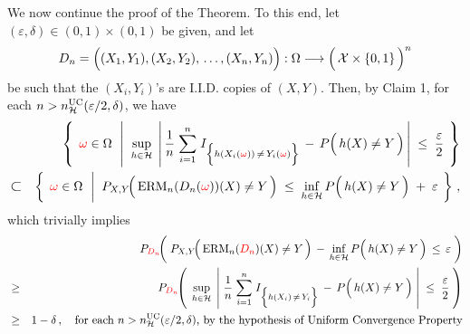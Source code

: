 \vskip 0.5cm
\noindent
We now continue the proof of the Theorem.
To this end, let $(\varepsilon,\delta) \in (0,1) \times (0,1)$ be given, and let
\begin{equation*}
D_{n} = \left((X_{1},Y_{1}),(X_{2},Y_{2}),\,\overset{{\color{white}\vert}}{\ldots}\,,(X_{n},Y_{n})\right)
	: \Omega \longrightarrow
	\left(\,\mathcal{X}\overset{{\color{white}.}}{\times}\{0,1\}\,\right)^{n}
\end{equation*}
be such that the
$(X_{i},Y_{i})$'s are I.I.D. copies of $(X,Y)$.
Then, by Claim 1,
for each $n > n^{\textnormal{UC}}_{\mathcal{H}}(\varepsilon/2,\delta)$, we have
\begin{eqnarray*}
&&
	\left\{\;\,
		{\color{red}\omega} \in \Omega
		\;\,\left\vert\;\;
		\underset{h \in \mathcal{H}}{\sup}\;\left\vert\,
			\dfrac{1}{n}\;\overset{n}{\underset{i=1}{\sum}}\;
				I_{\left\{h(X_{i}({\color{red}\omega}))\,\overset{{\color{white}.}}{\neq}\,Y_{i}({\color{red}\omega})\right\}}
				\,-\,
				P\!\left(\,\overset{{\color{white}.}}{h}(X) \neq Y \,\right)
			\,\right\vert
		\;\leq\;
			\dfrac{\varepsilon}{2}
		\right.\;\right\}
\\
& \textnormal{\large$\subset$} &
	\left\{\;\,
		{\color{red}\omega} \in \Omega
		\;\,\left\vert\;\;
		P_{X,Y}\!\!\left(\,\overset{{\color{white}.}}{\textnormal{ERM}}_{n}(D_{n}({\color{red}\omega}))(X) \neq Y \,\right)
		\; \leq \;
			\underset{h\in\mathcal{H}}{\inf}\,P\!\left(\,\overset{{\color{white}.}}{h}(X) \neq Y \,\right)
			\; + \; \varepsilon
		\right.\;\right\}\,,
\end{eqnarray*}
which trivially implies
\begin{eqnarray*}
&&
P_{{\color{red}D_{n}}}\!\!\left(\;
	P_{X,Y}\!\!\left(\,\overset{{\color{white}.}}{\textnormal{ERM}}_{n}({\color{red}D_{n}})(X) \neq Y \,\right)
		\,-\,
		\underset{h\in\mathcal{H}}{\inf}\,P\!\left(\,\overset{{\color{white}.}}{h}(X) \neq Y \,\right)
	\,\leq\,
		\varepsilon
	\;\right)
\\
& \geq &
	P_{{\color{red}D_{n}}}\!\!\left(\;\,
		\underset{h \in \mathcal{H}}{\sup}\;\left\vert\;
			\dfrac{1}{n}\;\overset{n}{\underset{i=1}{\sum}}\;
				I_{\left\{h(X_{i})\,\overset{{\color{white}.}}{\neq}\,Y_{i}\right\}}
				\,-\,
				P\!\left(\,\overset{{\color{white}.}}{h}(X) \neq Y \,\right)
			\;\right\vert
		\;\leq\;
			\dfrac{\varepsilon}{2}
		\;\right)
\\
& \geq &
	1 - \delta\,,
	\quad
	\textnormal{for each $n > n^{\textnormal{UC}}_{\mathcal{H}}(\varepsilon/2,\delta)$,
	by the hypothesis of Uniform Convergence Property}
\end{eqnarray*}
